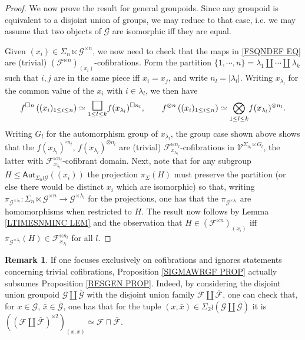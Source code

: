 \documentclass[a4paper,10pt
]{article}%
\numberwithin{equation}{section}
\numberwithin{figure}{section}
\theoremstyle{definition} %
\newtheorem{remark}[equation]{Remark}%
\newcommand{\F}{\ensuremath{\mathcal F}}
\newcommand{\V}{\ensuremath{\mathcal V}}
\newcommand{\G}{\ensuremath{\mathcal G}}
\newcommand{\1}{\ensuremath{\mathbbm 1}}%
\begin{document}
\begin{proof}
	
	We now prove the result for general groupoids.
	Since any groupoid is equivalent to a disjoint union of groups, 
	we may reduce to that case, i.e. we may assume that two objects of $\G$ are isomorphic iff they are equal.
	
	Given $(x_i) \in \Sigma_n \ltimes \G^{\times n}$,
	we now need to check that the maps in \eqref{FSQNDEF EQ}
	are (trivial) $\left(\F^{\ltimes n}\right)_{(x_i)}$-cofibrations.
	Form the partition 
	$\{1,\cdots,n\} = \lambda_1 \amalg \cdots \amalg \lambda_k$
	such that $i,j$ are in the same piece iff $x_i=x_j$, and write
	$n_l = |\lambda_l|$.
	Writing $x_{\lambda_l}$ for the common value of the $x_i$ with $i\in \lambda_l$, we then have
	\[
	f^{\square n}\left((x_i)_{1\leq i \leq n }\right)
	\simeq
	\underset{1\leq l \leq k}{\mathlarger{\mathlarger{\mathlarger{\square}}}} f(x_{\lambda_l})^{\square n_l},
	\qquad
	f^{\otimes n}\left((x_i)_{1\leq i \leq n }\right)
	\simeq
	\underset{1\leq l \leq k}{\bigotimes} f(x_{\lambda_l})^{\otimes n_l}.
	\]
	Writing $G_l$ for the automorphism group of $x_{\lambda_l}$,
	the group case shown above shows that the
	$f(x_{\lambda_l})^{\square n_l}$,
	$f(x_{\lambda_l})^{\otimes n_l}$
	are (trivial) $\F_{x_{\lambda_l}}^{\ltimes n_l}$-cofibrations
	in $\V^{\Sigma_{n_l}\ltimes G_l}$,
	the latter with 
	$\F_{x_{\lambda_l}}^{\ltimes n_l}$-cofibrant domain.
	Next, note that for any subgroup
	$H \leq \mathsf{Aut}_{\Sigma_n \wr \G}((x_i))$ the projection 
	$\pi_{\Sigma}(H)$ must preserve the partition 
	(or else there would be distinct $x_i$ which are isomorphic) 
	so that, writing 
	$\pi_{\G^{\times \lambda_l}} \colon
	\Sigma_n \ltimes \G^{\times n} \to \G^{\times \lambda_l}$
	for the projections,
	one has that the 
	$\pi_{\G^{\times \lambda_l}}$ are homomorphisms when restricted to $H$. The result now follows by Lemma \ref{LTIMESNMINC LEM}
	and the observation that
	$H \in \left(\F^{\ltimes n}\right)_{(x_i)}$
	iff
	$\pi_{\G^{\times \lambda_l}}(H) \in \F_{x_{\lambda_l}}^{\ltimes n_l}$
	for all $l$.
\end{proof}


\begin{remark}
	If one focuses exclusively on cofibrations and ignores statements concerning trivial cofibrations,
	Proposition \ref{SIGMAWRGF PROP} actually subsumes Proposition \ref{RESGEN PROP}. 
	Indeed, by considering the disjoint union groupoid 
	$\G \amalg \bar{\G}$
	with the disjoint union family 
	$\F \amalg \bar{\F}$,
	one can check that, for
	$x \in \G$, $\bar{x} \in \bar{\G}$,
	one has that for the tuple $(x,\bar{x}) \in \Sigma_2 \wr (\G \amalg \bar{\G})$
	it is
	$\left(\left(\F \amalg \bar{\F}\right)^{\ltimes 2}\right)_{(x,\bar{x})} \simeq \F \sqcap \bar{\F}$.
\end{remark}
\end{document}

